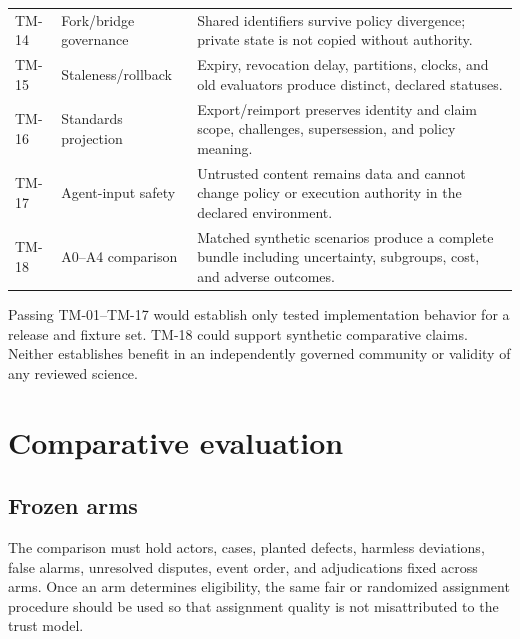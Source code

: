 \documentclass[11pt]{article}
\begin{document}
\begin{longtable}{p{}p{}p{}}
TM-14 & Fork/bridge governance & Shared identifiers survive policy divergence; private state is not copied without authority. \\
TM-15 & Staleness/rollback & Expiry, revocation delay, partitions, clocks, and old evaluators produce distinct, declared statuses. \\
TM-16 & Standards projection & Export/reimport preserves identity and claim scope, challenges, supersession, and policy meaning. \\
TM-17 & Agent-input safety & Untrusted content remains data and cannot change policy or execution authority in the declared environment. \\
TM-18 & A0--A4 comparison & Matched synthetic scenarios produce a complete bundle including uncertainty, subgroups, cost, and adverse outcomes. \\
\bottomrule
\end{longtable}

Passing TM-01--TM-17 would establish only tested implementation behavior for a
release and fixture set. TM-18 could support synthetic comparative claims. Neither
establishes benefit in an independently governed community or validity of any
reviewed science.

\section{Comparative evaluation}
\label{sec:evaluation}

\subsection{Frozen arms}

The comparison must hold actors, cases, planted defects, harmless deviations, false
alarms, unresolved disputes, event order, and adjudications fixed across arms. Once
an arm determines eligibility, the same fair or randomized assignment procedure
should be used so that assignment quality is not misattributed to the trust model.
\end{document}
